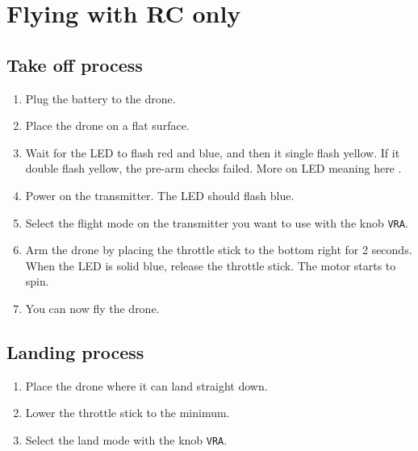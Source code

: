 \section{Flying with RC only}

\subsection{Take off process}
\begin{enumerate}
    \item Plug the battery to the drone.
    \item Place the drone on a flat surface.
    \item Wait for the LED to flash red and blue, and then it single flash yellow. If it double flash yellow, the pre-arm checks failed. More on LED meaning here \cite{ardupilot_leds}.
    \item Power on the transmitter. The LED should flash blue.
    \item Select the flight mode on the transmitter you want to use with the knob \texttt{VRA}.
    \item Arm the drone by placing the throttle stick to the bottom right for 2 seconds. When the LED is solid blue, release the throttle stick. The motor starts to spin.
    \item You can now fly the drone.
\end{enumerate}

\subsection{Landing process}
\begin{enumerate}
    \item Place the drone where it can land straight down.
    \item Lower the throttle stick to the minimum.
    \item Select the land mode with the knob \texttt{VRA}.
\end{enumerate}
